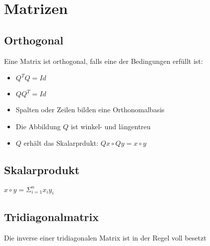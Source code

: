 \section{Matrizen}
\subsection{Orthogonal}
Eine Matrix ist orthogonal, falls eine der Bedingungen erfüllt ist:
\begin{itemize}
	\item $Q^TQ=Id$
	\item $QQ^T=Id$
	\item Spalten oder Zeilen bilden eine Orthonomalbasis
	\item Die Abbildung $Q$ ist winkel- und längentreu
	\item $Q$ erhält das Skalarprdukt: $Qx\circ Qy = x \circ y$
\end{itemize}
\subsection{Skalarprodukt}
$x\circ y=\displaystyle\Sigma_{i=1}^nx_iy_i$
\subsection{Tridiagonalmatrix}
Die inverse einer tridiagonalen Matrix ist in der Regel voll besetzt